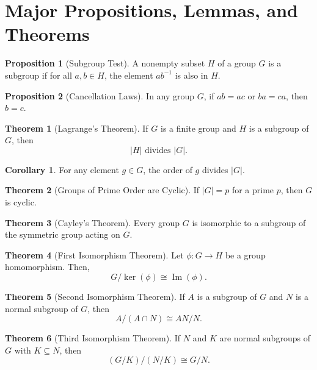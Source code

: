 \documentclass[12pt]{article}
\theoremstyle{definition} %
\newtheorem{proposition}{Proposition}
\newtheorem{theorem}{Theorem}
\newtheorem{corollary}{Corollary}
\theoremstyle{plain} %
\begin{document}
\newpage

\section*{Major Propositions, Lemmas, and Theorems}

\begin{proposition}[Subgroup Test]
A nonempty subset \(H\) of a group \(G\) is a subgroup if for all \(a, b \in H\), the element \(ab^{-1}\) is also in \(H\).
\end{proposition}

\begin{proposition}[Cancellation Laws]
In any group \(G\), if \(ab = ac\) or \(ba = ca\), then \(b = c\).
\end{proposition}

\begin{theorem}[Lagrange's Theorem]
If \(G\) is a finite group and \(H\) is a subgroup of \(G\), then
\[
|H| \text{ divides } |G|.
\]
\end{theorem}

\begin{corollary}
For any element \(g\in G\), the order of \(g\) divides \(|G|\).
\end{corollary}

\begin{theorem}[Groups of Prime Order are Cyclic]
If \(|G| = p\) for a prime \(p\), then \(G\) is cyclic.
\end{theorem}

\begin{theorem}[Cayley's Theorem]
Every group \(G\) is isomorphic to a subgroup of the symmetric group acting on \(G\).
\end{theorem}

\begin{theorem}[First Isomorphism Theorem]
Let \(\phi: G \to H\) be a group homomorphism. Then,
\[
G/\ker(\phi) \cong \operatorname{Im}(\phi).
\]
\end{theorem}

\begin{theorem}[Second Isomorphism Theorem]
If \(A\) is a subgroup of \(G\) and \(N\) is a normal subgroup of \(G\), then
\[
A/(A\cap N) \cong AN/N.
\]
\end{theorem}

\begin{theorem}[Third Isomorphism Theorem]
If \(N\) and \(K\) are normal subgroups of \(G\) with \(K \subseteq N\), then
\[
(G/K)/(N/K) \cong G/N.
\]
\end{theorem}
\end{document}
